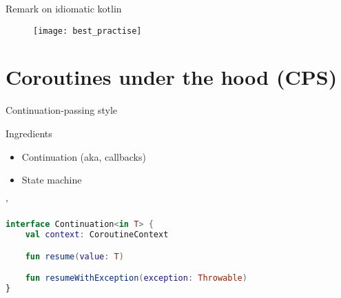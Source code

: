 \documentclass[10pt]{beamer}
\begin{document}
\begin{frame}
	Remark on idiomatic kotlin
	\begin{figure}
		\texttt{[image: best\_practise]}
	\end{figure}
\end{frame}

\section{Coroutines under the hood (CPS)}
\begin{frame}{Continuation-passing style}

Ingredients
	\begin{itemize}
		\item Continuation (aka, callbacks) 
		\item State machine 
	\end{itemize}
\end{frame}

'
\begin{frame}[fragile]
\begin{lstlisting}[language=Kotlin, basicstyle=\ttfamily]
interface Continuation<in T> {
    val context: CoroutineContext

    fun resume(value: T)

    fun resumeWithException(exception: Throwable)
}
\end{lstlisting}
\end{frame}
\end{document}
